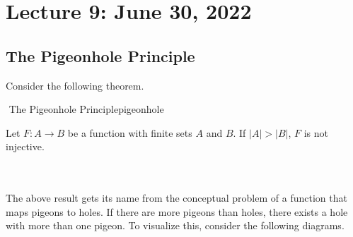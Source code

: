    \pagebreak

    \section{Lecture 9: June 30, 2022}
    
    \subsection{The Pigeonhole Principle}
    
        Consider the following theorem.
        \begin{theorem}{\Stop\,\,The Pigeonhole Principle}{pigeonhole}
        
            Let \(F:A\to B\) be a function with finite sets \(A\) and \(B\). If \(|A|>|B|\), \(F\) is not injective.
            
        \end{theorem}
        \vphantom
        \\
        \\
        The above result gets its name from the conceptual problem of a function that maps pigeons to holes. If there are more pigeons than holes, there exists a hole with more than one pigeon. To visualize this, consider the following diagrams.
